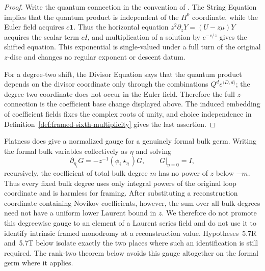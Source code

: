 \begin{proof}
Write the quantum connection in the convention of
\cite[(2.2)--(2.3) and Remark~2.3]{IritaniBlowup}.  The String Equation
implies that the quantum product is independent of the $H^0$ coordinate,
while the Euler field acquires $c\mathbf1$.  Thus the horizontal equation
$z^2\partial_zY=(U-z\mu)Y$ acquires the scalar term $cI$, and multiplication
of a solution by $e^{-c/z}$ gives the shifted equation.  This exponential is
single-valued under a full turn of the original $z$-disc and changes no
regular exponent or descent datum.

For a degree-two shift, the Divisor Equation says that the quantum product
depends on the divisor coordinate only through the combinations
$Q^d e^{\langle D,d\rangle}$; the degree-two coordinate does not occur in
the Euler field.  Therefore the full $z$-connection is the coefficient
base change displayed above.  The induced embedding of coefficient fields
fixes the complex roots of unity, and choice independence in
Definition~\ref{def:framed-sixth-multiplicity} gives the last assertion.
\end{proof}

\begin{remark}
\label{rem:residual-bulk-gap}
Flatness does give a normalized gauge for a genuinely formal bulk germ.
Writing the formal bulk variables collectively as $\eta$ and solving
\[
 \partial_{\eta_i}G=-z^{-1}(\phi_i\star_\eta)G,
 \qquad G|_{\eta=0}=I,
\]
recursively, the coefficient of total bulk degree $m$ has no power of $z$
below $-m$.  Thus every fixed bulk degree uses only integral powers of the
original loop coordinate and is harmless for framing.  After substituting a
reconstruction coordinate containing Novikov coefficients, however, the sum
over all bulk degrees need not have a uniform lower Laurent bound in $z$.
We therefore do not promote this degreewise gauge to an element of a Laurent
series field and do not use it to identify intrinsic framed monodromy at a
reconstruction value.  Hypotheses~5.7R and~5.7T below isolate exactly the two
places where such an identification is still required.  The rank-two theorem
below avoids this gauge altogether on the formal germ where it applies.
\end{remark}

